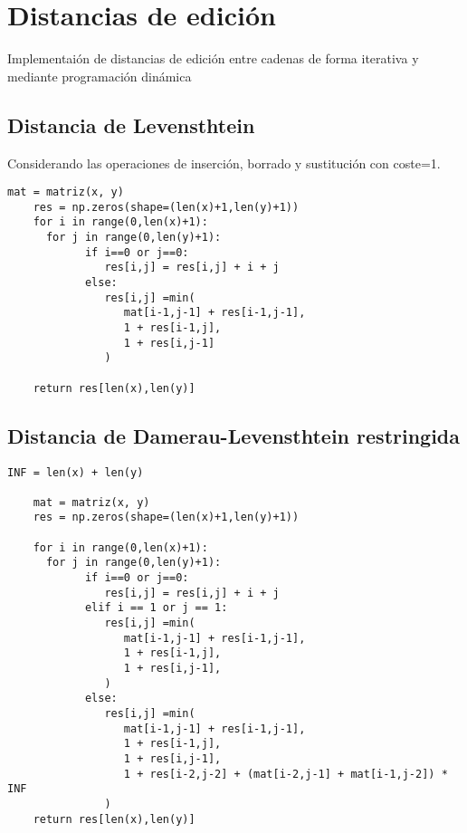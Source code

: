 \section{Distancias de edición}
Implementaión de distancias de edición entre cadenas de forma iterativa y mediante programación dinámica

\subsection{Distancia de Levensthtein}
Considerando las operaciones de inserción, borrado y sustitución con coste=1.

\begin{lstlisting}[caption=Algoritmo distancia de levenshtein]
    mat = matriz(x, y)
    res = np.zeros(shape=(len(x)+1,len(y)+1))
    for i in range(0,len(x)+1):
      for j in range(0,len(y)+1):
            if i==0 or j==0:
               res[i,j] = res[i,j] + i + j
            else:
               res[i,j] =min(
                  mat[i-1,j-1] + res[i-1,j-1],
                  1 + res[i-1,j],
                  1 + res[i,j-1]
               )
               
    return res[len(x),len(y)]
\end{lstlisting}


\subsection{Distancia de Damerau-Levensthtein restringida}

\begin{lstlisting}[label={list:first},caption=Sample Python code -- Damerau-Levensthtein restringido]
    INF = len(x) + len(y)

    mat = matriz(x, y)
    res = np.zeros(shape=(len(x)+1,len(y)+1))

    for i in range(0,len(x)+1):
      for j in range(0,len(y)+1):
            if i==0 or j==0:
               res[i,j] = res[i,j] + i + j
            elif i == 1 or j == 1:
               res[i,j] =min(
                  mat[i-1,j-1] + res[i-1,j-1],
                  1 + res[i-1,j],
                  1 + res[i,j-1],
               )
            else:
               res[i,j] =min(
                  mat[i-1,j-1] + res[i-1,j-1],
                  1 + res[i-1,j],
                  1 + res[i,j-1],
                  1 + res[i-2,j-2] + (mat[i-2,j-1] + mat[i-1,j-2]) * INF
               )
    return res[len(x),len(y)]
\end{lstlisting}

